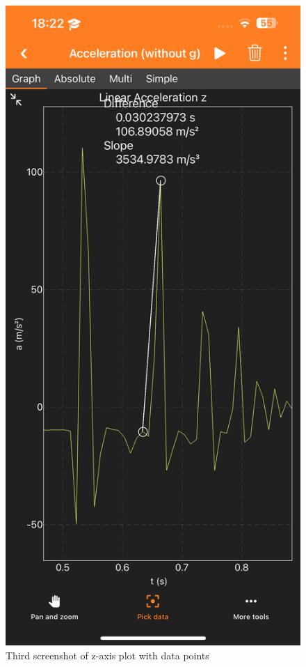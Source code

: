 \documentclass[idxtotoc,hyperref,openany]{labbook} %
\begin{document}
\begin{figure}[H] %
\begin{center}
\includegraphics[width=.7\linewidth]{images/Lab.02/PhoneDropZAnnotated3.PNG}
\end{center}
\caption{Third screenshot of z-axis plot with data points}
\label{fig:Lab02-PhoneDropZAnnotated3}
\end{figure}
\end{document}
